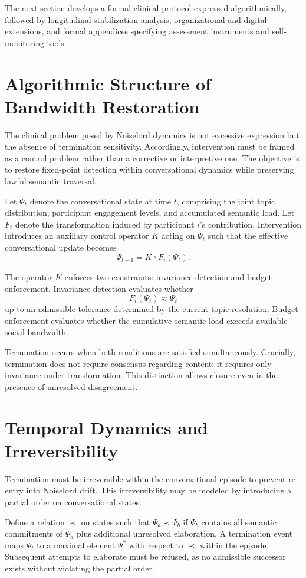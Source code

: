 \documentclass[12pt]{article}
\theoremstyle{remark}
\begin{document}
The next section develops a formal clinical protocol expressed algorithmically, followed by longitudinal stabilization analysis, organizational and digital extensions, and formal appendices specifying assessment instruments and self-monitoring tools.

\section{Algorithmic Structure of Bandwidth Restoration}

The clinical problem posed by Noiselord dynamics is not excessive expression but the absence of termination sensitivity. Accordingly, intervention must be framed as a control problem rather than a corrective or interpretive one. The objective is to restore fixed-point detection within conversational dynamics while preserving lawful semantic traversal.

Let $\Psi_t$ denote the conversational state at time $t$, comprising the joint topic distribution, participant engagement levels, and accumulated semantic load. Let $F_i$ denote the transformation induced by participant $i$'s contribution. Intervention introduces an auxiliary control operator $K$ acting on $\Psi_t$ such that the effective conversational update becomes
\[
\Psi_{t+1} = K \circ F_i(\Psi_t).
\]

The operator $K$ enforces two constraints: invariance detection and budget enforcement. Invariance detection evaluates whether
\[
F_i(\Psi_t) \approx \Psi_t
\]
up to an admissible tolerance determined by the current topic resolution. Budget enforcement evaluates whether the cumulative semantic load exceeds available social bandwidth.

Termination occurs when both conditions are satisfied simultaneously. Crucially, termination does not require consensus regarding content; it requires only invariance under transformation. This distinction allows closure even in the presence of unresolved disagreement.

\section{Temporal Dynamics and Irreversibility}

Termination must be irreversible within the conversational episode to prevent re-entry into Noiselord drift. This irreversibility may be modeled by introducing a partial order on conversational states.

Define a relation $\prec$ on states such that $\Psi_a \prec \Psi_b$ if $\Psi_b$ contains all semantic commitments of $\Psi_a$ plus additional unresolved elaboration. A termination event maps $\Psi_t$ to a maximal element $\Psi^\ast$ with respect to $\prec$ within the episode. Subsequent attempts to elaborate must be refused, as no admissible successor exists without violating the partial order.
\end{document}
